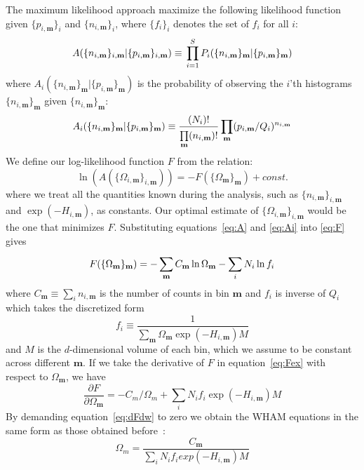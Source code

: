 The maximum likelihood approach maximize the following likelihood function given 
$\{p_{i,\mathbf{m}}\}_i$ and $\{n_{i,\mathbf{m}}\}_i$, where $\{f_i\}_i$ denotes the set 
of $f_i$ for all $i$:
\begin{equation}
A(\{n_{i,\mathbf{m}}\}_{i,\mathbf{m}} | \{p_{i,\mathbf{m}}\}_{i,\mathbf{m}}) \equiv \\
\prod_{i=1}^{S} P_{i}(\{n_{i,\mathbf{m}}\}_{\mathbf{m}} | \{p_{i,\mathbf{m}}\}_{\mathbf{m}})
\label{eq:A}
\end{equation}
where $A_{i}(\{n_{i,\mathbf{m}}\}_{\mathbf{m}} | \{p_{i,\mathbf{m}}\}_{\mathbf{m}})$ 
is the probability of observing the $i$'th histograms $\{n_{i,\mathbf{m}}\}_{\mathbf{m}}$ 
given $\{n_{i,\mathbf{m}}\}_{\mathbf{m}}$:
\begin{equation}
A_{i}(\{n_{i,\mathbf{m}}\}_{\mathbf{m}} | \{p_{i,\mathbf{m}}\}_{\mathbf{m}}) \equiv \\
\frac{(N_i)!}{\prod\limits_{\mathbf{m}}^{} (n_{i,\mathbf{m}})!} \\
\prod\limits_{\mathbf{m}}^{} (p_{i,\mathbf{m}}/Q_{i})^{n_{i,\mathbf{m}}}
\label{eq:Ai}
\end{equation}
We define our log-likelihood function $F$ from the relation:
\begin{equation}
\ln(A(\{\Omega_{i,\mathbf{m}}\}_{i,\mathbf{m}})) = - F(\{\Omega_{\mathbf{m}}\}_{\mathbf{m}}) + const.
\label{eq:F}
\end{equation}
where we treat all the quantities known during the analysis, such as 
$\{n_{i,\mathbf{m}}\}_{i,\mathbf{m}}$ and $\exp(-H_{i,\mathbf{m}})$, as constants.
Our optimal estimate of $\{\Omega_{i,\mathbf{m}}\}_{i,\mathbf{m}}$ would be the one 
that minimizes $F$. Substituting equations~\ref{eq:A} and \ref{eq:Ai} into \ref{eq:F} 
gives 
\begin{equation}
F(\{\Omega_{\mathbf{m}}\}_{\mathbf{m}}) = -\sum_{\mathbf{m}}^{} C_{\mathbf{m}} \ln \Omega_{\mathbf{m}} \\
- \sum_{i}^{} N_i \ln f_{i}
\label{eq:Fex}
\end{equation}
where $C_{\mathbf{m}} \equiv \sum\limits_{i}^{} n_{i,\mathbf{m}}$ is the number of counts
in bin $\mathbf{m}$ and $f_{i}$ is inverse of $Q_{i}$ which takes the discretized form
\begin{equation}
f_{i} \equiv \frac{1}{\sum_{\mathbf{m}}^{} \Omega_{\mathbf{m}} \exp(-H_{i,\mathbf{m}}) M}
\end{equation}
and $M$ is the $d$-dimensional volume of each bin, which we assume to be constant across 
different $\mathbf{m}$. If we take the derivative of $F$ in equation~\ref{eq:Fex} with
respect to $\Omega_{\mathbf{m}}$, we have
\begin{equation}
\frac{\partial F}{\partial \Omega_{\mathbf{m}}} = -C_{m}/\Omega_{m} + \sum_{i}^{} N_{i} f_{i} \exp(-H_{i,\mathbf{m}}) M
\label{eq:dFdw}
\end{equation}
By demanding equation~\ref{eq:dFdw} to zero we obtain the WHAM equations in the same form 
as those obtained before~\cite{Zhu2012,Chodera2007,Kumar1992}:
\begin{equation}
\Omega_{m} = \frac{C_{\mathbf{m}}}{\sum\limits_{i}^{} N_{i} f_{i} exp(-H_{i,\mathbf{m}}) M}
\label{eq:WHAM1}
\end{equation}
